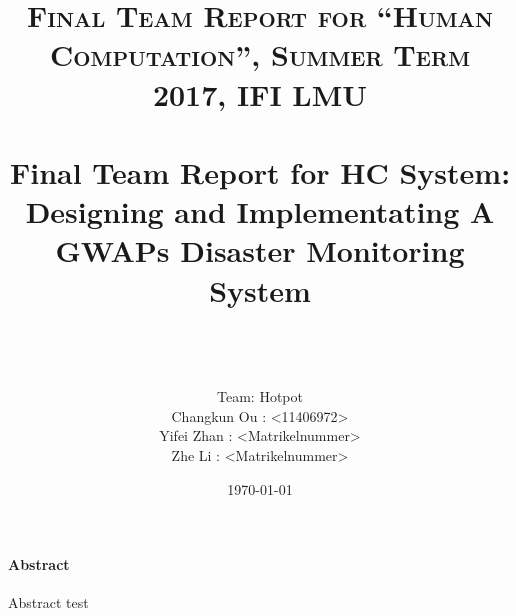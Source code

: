 \documentclass[paper=a4, fontsize=11pt]{scrartcl} %
\title{	
\normalfont \normalsize 
\textsc{Final Team Report for ``Human Computation'', Summer Term 2017, IFI LMU} \\ [25pt]
\horrule{0.5pt} \\[0.4cm] %
\huge Final Team Report for HC System: \\
Designing and Implementating A GWAPs Disaster Monitoring System\\%
\horrule{2pt} \\[0.5cm] %
}
\author{\\ Team: Hotpot\\Changkun Ou : <11406972> \\Yifei Zhan : <Matrikelnummer> \\Zhe Li : <Matrikelnummer>  }
\date{\today}
\numberwithin{equation}{section} %
\numberwithin{figure}{section} %
\numberwithin{table}{section} %
\begin{document}
\maketitle %

\tableofcontents

\paragraph{Abstract}

Abstract test








\nocite{*}


\end{document}
